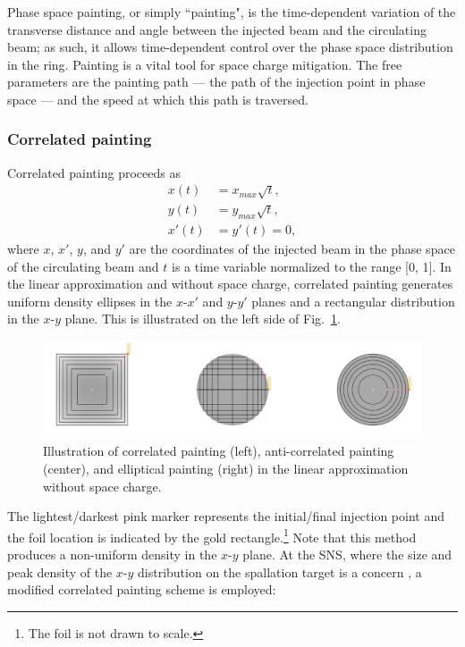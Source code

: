 Phase space painting, or simply ``painting", is the time-dependent variation of the transverse distance and angle between the injected beam and the circulating beam; as such, it allows time-dependent control over the phase space distribution in the ring. Painting is a vital tool for space charge mitigation. The free parameters are the painting path — the path of the injection point in phase space — and the speed at which this path is traversed. 


\subsubsection{Correlated painting}

Correlated painting proceeds as
%
\begin{equation}
\begin{aligned}
    {x}(t) &= {x}_{max}\sqrt{t}, \\
    {y}(t) &= {y}_{max}\sqrt{t}, \\
    x'(t) &= y'(t) = 0,
\end{aligned}
\end{equation}
%
where $x$, $x'$, $y$, and $y'$ are the coordinates of the injected beam in the phase space of the circulating beam and $t$ is a time variable normalized to the range [0, 1]. In the linear approximation and without space charge, correlated painting generates uniform density ellipses in the $x$-$x'$ and $y$-$y'$ planes and a rectangular distribution in the $x$-$y$ plane. This is illustrated on the left side of Fig.~\ref{fig:painting_graphic}. 
%
\begin{figure}[!p]
    \centering
    \includegraphics[width=\textwidth]{Images/chapter1/painting_graphic.png}
    \caption{Illustration of correlated painting (left), anti-correlated painting (center), and elliptical painting (right) in the linear approximation without space charge.}
    \label{fig:painting_graphic}
\end{figure}
%
The lightest/darkest pink marker represents the initial/final injection point and the foil location is indicated by the gold rectangle.\footnote{The foil is not drawn to scale.} Note that this method produces a non-uniform density in the $x$-$y$ plane. At the SNS, where the size and peak density of the $x$-$y$ distribution on the spallation target is a concern \cite{Riemer2010}, a modified correlated painting scheme is employed:
